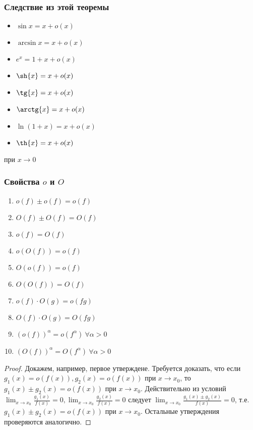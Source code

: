 \documentclass[12pt, a4paper]{article}
\begin{document}
    \subsubsection{Следствие из этой теоремы}
    \begin{itemize}
        \item $\sin{x} = x + o(x)$
        \item $\arcsin{x} = x + o(x)$
        \item $e^x = 1 + x + o(x)$
        \item $\sh{x} = x + o(x)$
        \item $\tg{x} = x + o(x)$
        \item $\arctg{x} = x + o(x)$
        \item $\ln (1 + x) = x + o(x)$
        \item $\th{x} = x + o(x)$
    \end{itemize}
    при $x \to 0$
    \subsubsection{Свойства $o$ и $O$}
     \begin{enumerate}
        \item $o(f) \pm o(f) = o(f)$
        \item $O(f) \pm O(f) = O(f)$
        \item $o(f) = O(f)$
        \item $o(O(f)) = o(f)$
        \item $O(o(f)) = o(f)$
        \item $O(O(f)) = O(f)$
        \item $o(f) \cdot O(g) = o(fg)$
        \item $O(f) \cdot O(g) = O(fg)$
        \item $(o(f))^{\alpha} = o(f^{\alpha}) \ \forall \alpha > 0$
        \item $(O(f))^{\alpha} = O(f^{\alpha}) \ \forall \alpha > 0$
    \end{enumerate}
    \begin{proof}
    Докажем, например, первое утверждене. Требуется доказать, что если $g_1(x) = o(f(x)), g_2(x) = o(f(x))$ при $x \to x_0$, то $g_1(x) \pm g_2(x) = o(f(x))$ при $x \to x_0$. Действительно из условий $\lim_{x \to x_0} \frac{g_1(x)}{f(x)}=0, \lim_{x \to x_0} \frac{g_2(x)}{f(x)} = 0$ следует $\lim_{x \to x_0} \frac{g_1(x) \pm g_2(x)}{f(x)} = 0$, т.е. $g_1(x) \pm g_2(x) = o(f(x))$ при $x \to x_0$. Остальные утверждения проверяются аналогично.
    \end{proof}
\end{document}
